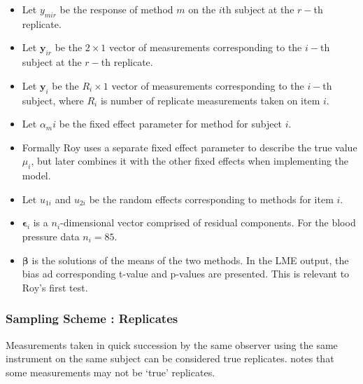 \documentclass[12pt, a4paper]{report}
\theoremstyle{plain}
\theoremstyle{definition}
\theoremstyle{remark}
\begin{document}
\newpage
\begin{itemize}
	\item Let $y_{mir}$ be the response of method $m$ on the $i$th subject
	at the $r-$th replicate.
	\item Let $\boldsymbol{y}_{ir}$ be the $2 \times 1$ vector of measurements
	corresponding to the $i-$th subject at the $r-$th replicate.
	\item Let $\boldsymbol{y}_{i}$ be the $R_i \times 1$ vector of
	measurements corresponding to the $i-$th subject, where $R_i$ is number of replicate measurements taken on item $i$.
	\item Let $\alpha_mi$ be the fixed effect parameter for method for subject $i$.
	\item Formally Roy uses a separate fixed effect parameter to describe the true value $\mu_i$, but later combines it with the other fixed effects when implementing the model.
	\item Let $u_{1i}$ and $u_{2i}$ be the random effects corresponding to methods for item $i$.
	
	\item $\boldsymbol{\epsilon}_{i}$ is a $n_{i}$-dimensional vector
	comprised of residual components. For the blood pressure data $n_{i} = 85$.
	
	\item $\boldsymbol{\beta}$ is the solutions of the means of the two methods. In the LME output, the bias ad corresponding
	t-value and p-values are presented. This is relevant to Roy's first test.\end{itemize}



























\subsubsection{Sampling Scheme : Replicates}
Measurements taken in quick succession by the same observer using the same instrument on the same subject can be considered true replicates. \citet{ARoy2009} notes that some measurements may not be `true' replicates.
\end{document}
